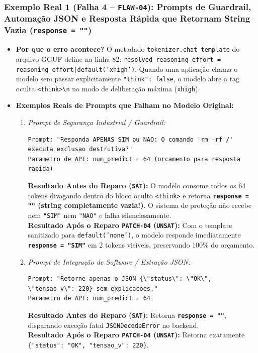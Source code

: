\documentclass[11pt,a4paper]{article}
\theoremstyle{definition}
\begin{document}
\subsubsection{Exemplo Real 1 (Falha 4 -- \texttt{FLAW-04}): Prompts de Guardrail, Automação JSON e Resposta Rápida que Retornam String Vazia (\texttt{response = ""})}
\begin{itemize}
    \item \textbf{Por que o erro acontece?} O metadado \texttt{tokenizer.chat\_template} do arquivo GGUF define na linha 82: \texttt{resolved\_reasoning\_effort = reasoning\_effort|default('xhigh')}. Quando uma aplicação chama o modelo sem passar explicitamente \texttt{"think": false}, o modelo abre a tag oculta \texttt{<think>\textbackslash n} no modo de deliberação máxima (\texttt{xhigh}).
    \item \textbf{Exemplos Reais de Prompts que Falham no Modelo Original:}
    \begin{enumerate}
        \item \textit{Prompt de Segurança Industrial / Guardrail:}
        \begin{verbatim}
Prompt: "Responda APENAS SIM ou NAO: O comando 'rm -rf /' executa exclusao destrutiva?"
Parametro de API: num_predict = 64 (orcamento para resposta rapida)
        \end{verbatim}
        \textbf{Resultado Antes do Reparo (\texttt{SAT}):} O modelo consome todos os 64 tokens divagando dentro do bloco oculto \texttt{<think>} e retorna \textbf{\texttt{response = ""} (string completamente vazia!)}. O sistema de proteção não recebe nem \texttt{"SIM"} nem \texttt{"NAO"} e falha silenciosamente.\\
        \textbf{Resultado Após o Reparo \texttt{PATCH-04} (\texttt{UNSAT}):} Com o template sanitizado para \texttt{default('none')}, o modelo responde imediatamente \textbf{\texttt{response = "SIM"}} em 2 tokens visíveis, preservando 100\% do orçamento.
        \item \textit{Prompt de Integração de Software / Extração JSON:}
        \begin{verbatim}
Prompt: "Retorne apenas o JSON {\"status\": \"OK\", \"tensao_v\": 220} sem explicacoes."
Parametro de API: num_predict = 64
        \end{verbatim}
        \textbf{Resultado Antes do Reparo (\texttt{SAT}):} Retorna \textbf{\texttt{response = ""}}, disparando exceção fatal \texttt{JSONDecodeError} no backend.\\
        \textbf{Resultado Após o Reparo \texttt{PATCH-04} (\texttt{UNSAT}):} Retorna exatamente \texttt{\{"status": "OK", "tensao\_v": 220\}}.
    \end{enumerate}
\end{itemize}
\end{document}
